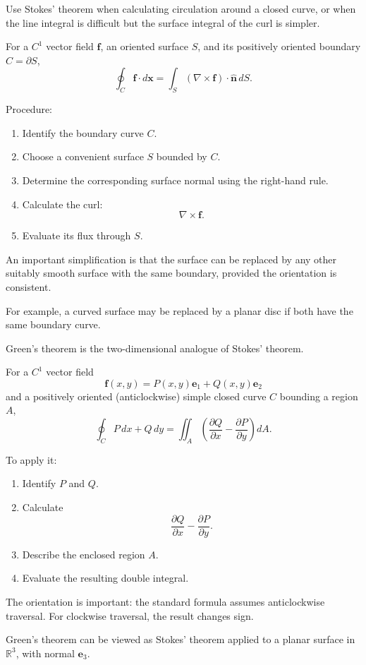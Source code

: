 \begin{method}
Use Stokes' theorem when calculating circulation around a closed curve, or when the line integral is difficult but the surface integral of the curl is simpler.

For a \(C^1\) vector field \(\boldsymbol f\), an oriented surface \(S\), and its positively oriented boundary \(C=\partial S\),
\[
\boxed{
\oint_C\boldsymbol f\cdot d\boldsymbol x
=
\int_S(\nabla\times\boldsymbol f)
\cdot\hat{\boldsymbol n}\,dS.
}
\]

Procedure:

\begin{enumerate}
    \item Identify the boundary curve \(C\).
    \item Choose a convenient surface \(S\) bounded by \(C\).
    \item Determine the corresponding surface normal using the right-hand rule.
    \item Calculate the curl:
    \[
    \nabla\times\boldsymbol f.
    \]
    \item Evaluate its flux through \(S\).
\end{enumerate}

An important simplification is that the surface can be replaced by any other suitably smooth surface with the same boundary, provided the orientation is consistent.

For example, a curved surface may be replaced by a planar disc if both have the same boundary curve.
\end{method}

\begin{method}
Green's theorem is the two-dimensional analogue of Stokes' theorem.

For a \(C^1\) vector field
\[
\boldsymbol f(x,y)=P(x,y)\boldsymbol e_1+Q(x,y)\boldsymbol e_2
\]
and a positively oriented (anticlockwise) simple closed curve \(C\) bounding a region \(A\),
\[
\boxed{
\oint_C P\,dx+Q\,dy
=
\iint_A
\left(
\frac{\partial Q}{\partial x}
-
\frac{\partial P}{\partial y}
\right)dA.
}
\]

To apply it:

\begin{enumerate}
    \item Identify \(P\) and \(Q\).
    \item Calculate
    \[
    \frac{\partial Q}{\partial x}
    -
    \frac{\partial P}{\partial y}.
    \]
    \item Describe the enclosed region \(A\).
    \item Evaluate the resulting double integral.
\end{enumerate}

The orientation is important: the standard formula assumes anticlockwise traversal. For clockwise traversal, the result changes sign.

Green's theorem can be viewed as Stokes' theorem applied to a planar surface in \(\mathbb R^3\), with normal \(\boldsymbol e_3\).
\end{method}

